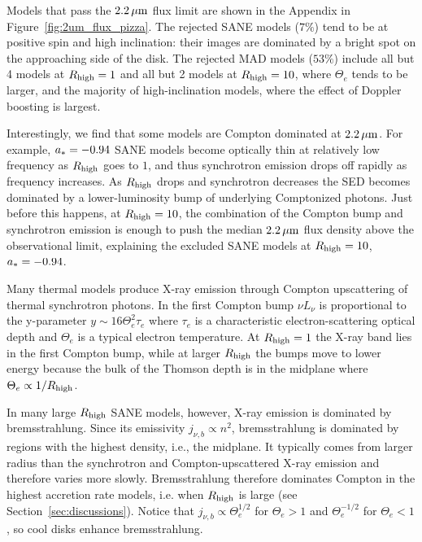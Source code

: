 Models that pass the $2.2\,\mu\mathrm{m}$ flux limit are shown in the Appendix in Figure~\ref{fig:2um_flux_pizza}.
The rejected SANE models ($7\%$) tend to be at positive spin and high inclination: their images are dominated by a bright spot on the approaching side of the disk.
The rejected MAD models ($53\%$) include all but 4 models at $R_\mathrm{high} = 1$ and all but 2 models at $R_\mathrm{high} = 10$, where $\Theta_e$ tends to be larger, and the majority of high-inclination models, where the effect of Doppler boosting is largest.

Interestingly, we find that some models are Compton dominated at $2.2\,\mu\mathrm{m}$.
For example, $a_* = -0.94$ SANE models become optically thin at relatively low frequency as $R_\mathrm{high}$ goes to $1$, and thus synchrotron emission drops off rapidly as frequency increases.
As $R_\mathrm{high}$ drops and synchrotron decreases the SED becomes dominated by a lower-luminosity bump of underlying Comptonized photons.
Just before this happens, at $R_\mathrm{high} = 10$, the combination of the Compton bump and synchrotron emission is enough to push the median $2.2\,\mu\mathrm{m}$ flux density above the observational limit, explaining the excluded SANE models at $R_\mathrm{high} = 10$, $a_* = -0.94$.


Many thermal models produce X-ray emission through Compton upscattering of thermal synchrotron photons.
In the first Compton bump $\nu L_\nu$ is proportional to the y-parameter $y \sim 16 \Theta_e^2 \tau_e$ where $\tau_e$ is a characteristic electron-scattering optical depth and $\Theta_e$ is a typical electron temperature.
At $R_\mathrm{high} = 1$ the X-ray band lies in the first Compton bump, while at larger $R_\mathrm{high}$ the bumps move to lower energy because the bulk of the Thomson depth is in the midplane where $\Theta_e \propto 1/R_\mathrm{high}$.

In many large $R_\mathrm{high}$ SANE models, however, X-ray emission is dominated by bremsstrahlung.
Since its emissivity $j_{\nu,b} \propto n^2$, bremsstrahlung is dominated by regions with the highest density, i.e., the midplane.
It typically comes from larger radius than the synchrotron and Compton-upscattered X-ray emission and therefore varies more slowly.
Bremsstrahlung therefore dominates Compton in the highest accretion rate models, i.e. when $R_\mathrm{high}$ is large (see Section~\ref{sec:discussions}).
Notice that $j_{\nu,b} \propto \Theta_e^{1/2}$ for $\Theta_e > 1$ and $\Theta_e^{-1/2}$ for $\Theta_e < 1$, so cool disks enhance bremsstrahlung.

